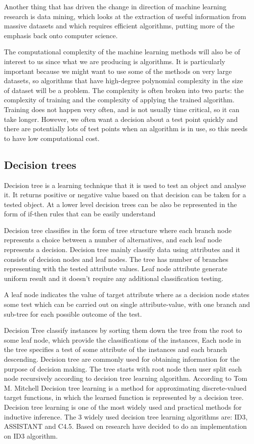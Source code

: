\documentclass{article}
\begin{document}
Another thing that has driven the change in direction of machine learning research is data mining, which looks at the extraction of useful information from massive datasets and which requires efficient algorithms, putting more of the emphasis back onto computer science. 

The computational complexity of the machine learning methods will also be of interest to us since what we are producing is algorithms. It is particularly important because we might want to use some of the methods on very large datasets, so algorithms that have high-degree polynomial complexity in the size of dataset will be a problem. The complexity is often broken into two parts: the complexity of training and the complexity of applying the trained algorithm.
Training does not happen very often, and is not usually time critical, so it can take longer. However, we often want a decision about a test point quickly and there are potentially lots of test points when an algorithm is in use, so this needs to have low computational cost.

\subsection{Decision trees}
\label{sec:dectree}


Decision tree is a learning technique that it is used to test an object and analyse it. It returns positive or negative value based on that decision can be taken for a tested object. At a lower level decision trees can be also be represented in the form of if-then rules that can be easily understand

Decision tree classifies in the form of tree structure where each branch node represents a choice between a number of alternatives, and each leaf node represents a decision. Decision tree mainly classify data using attributes and it consists of decision nodes and leaf nodes. The tree has number of branches representing with the tested attribute values. Leaf node attribute generate uniform result and it doesn't require any additional classification testing.	

A leaf node indicates the value of target attribute where as a decision node states some test which can be carried out on single attribute-value, with one branch and sub-tree for each possible outcome of the test.

Decision Tree classify instances by sorting them down the tree from the root to some leaf node, which provide the classifications of the instances, Each node in the tree specifies a test of some attribute of the instances and each branch descending.
Decision tree are commonly used for obtaining information for the purpose of decision making. The tree starts with root node then user split each node recursively according to decision tree learning algorithm.
According to Tom M. Mitchell Decision tree learning is a method for approximating discrete-valued target functions, in which the learned function is represented by a decision tree. Decision tree learning is one of the most widely used and practical methods for inductive inference. The 3 widely used decision tree learning algorithms are: ID3, ASSISTANT and C4.5. Based on research have decided to do an implementation on ID3 algorithm.
\end{document}
